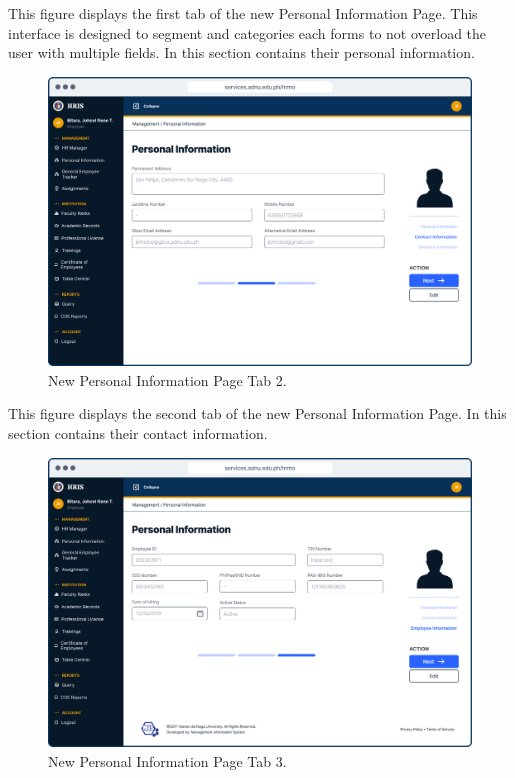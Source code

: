     This figure displays the first tab of the new Personal Information Page. This interface is designed to segment and categories each forms to not overload the user with multiple fields. In this section contains their personal information.

    \begin{figure}[H]
        \centering
        \includegraphics[width=1\linewidth]{figures/app/pi-2.png}
        \caption{New Personal Information Page Tab 2.}
        \label{fig:app-pi-2}
    \end{figure}

    This figure displays the second tab of the new Personal Information Page. In this section contains their contact information.

    \begin{figure}[H]
        \centering
        \includegraphics[width=1\linewidth]{figures/app/pi-3.png}
        \caption{New Personal Information Page Tab 3.}
        \label{fig:app-pi-3}
    \end{figure}

